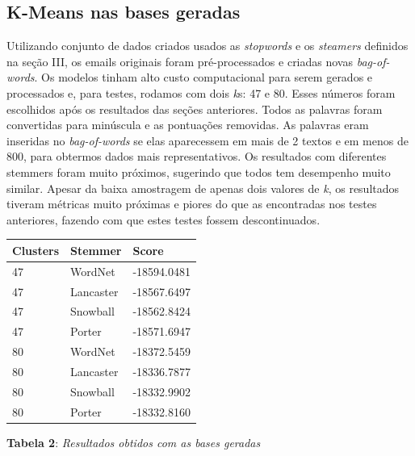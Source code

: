 \documentclass[conference]{IEEEtran}
\begin{document}
\subsection{K-Means nas bases geradas}
Utilizando conjunto de dados criados usados as \textit{stopwords} e os \textit{steamers} definidos na seção III, os emails originais foram pré-processados e criadas novas \textit{bag-of-words}. Os modelos tinham alto custo computacional para serem gerados e processados e, para testes, rodamos com dois \textit{k}s: 47 e 80. Esses números foram escolhidos após os resultados das seções anteriores. Todos as palavras foram convertidas para minúscula e as pontuações removidas. As palavras eram inseridas no \textit{bag-of-words} se elas aparecessem em mais de 2 textos e em menos de 800, para obtermos dados mais representativos. Os resultados com diferentes stemmers foram muito próximos, sugerindo que todos tem desempenho muito similar. Apesar da baixa amostragem de apenas dois valores de \textit{k}, os resultados tiveram métricas muito próximas e piores do que as encontradas nos testes anteriores, fazendo com que estes testes fossem descontinuados.\\


\begin{center}
\begin{tabular}{| l | l | l |}
 \hline
 \textbf{Clusters} &  \textbf{Stemmer}  &   \textbf{Score}  \\ \hline
47 &   WordNet &   -18594.0481 \\ \hline
47 &   Lancaster &   -18567.6497 \\ \hline
47 &   Snowball &  -18562.8424  \\ \hline
47 &   Porter &  -18571.6947  \\ \hline
80 &   WordNet &  -18372.5459  \\ \hline
80 &   Lancaster &  -18336.7877  \\ \hline
80 &   Snowball &  -18332.9902  \\ \hline
80 &   Porter &  -18332.8160  \\ \hline
\end{tabular} \newline

\textbf{Tabela 2}: \textit{Resultados obtidos com as bases geradas}
\end{center}
\end{document}
